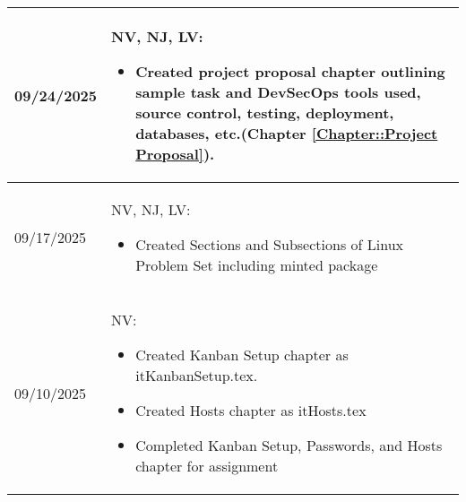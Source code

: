 \begin{longtable}{|l||p{13.5cm}|}
09/24/2025 & NV, NJ, LV:
\begin{itemize}[topsep=0pt,itemsep=0pt,parsep=0pt,partopsep=0pt,leftmargin=12pt]
\item Created project proposal chapter outlining sample task and DevSecOps tools used, source control, testing, deployment, databases, etc.(Chapter \ref{Chapter::Project Proposal}).
\end{itemize} 
\\ \hline

09/17/2025 & NV, NJ, LV:
\begin{itemize}[topsep=0pt,itemsep=0pt,parsep=0pt,partopsep=0pt,leftmargin=12pt]
\item Created Sections and Subsections of Linux Problem Set including minted package
\end{itemize} 
\\ \hline

09/10/2025 & NV:
\begin{itemize}[topsep=0pt,itemsep=0pt,parsep=0pt,partopsep=0pt,leftmargin=12pt]
\item Created Kanban Setup chapter as itKanbanSetup.tex.
\item Created Hosts chapter as itHosts.tex
\item Completed Kanban Setup, Passwords, and Hosts chapter for assignment
\end{itemize} 
\\ \hline



\end{longtable}


